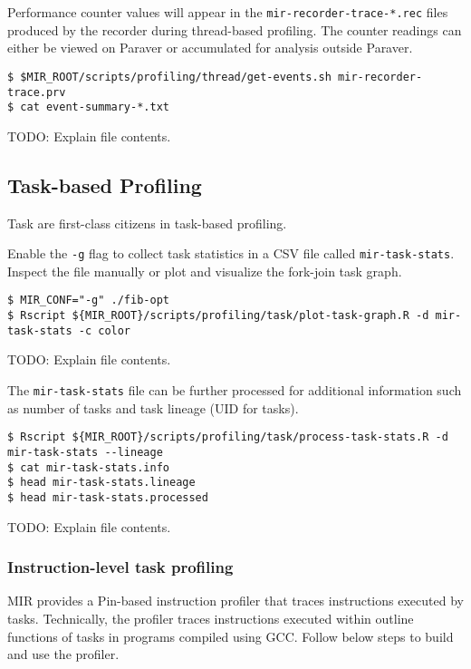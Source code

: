 \documentclass[11pt,a4paper]{article}
\begin{document}
Performance counter values will appear in the \texttt{mir-recorder-trace-*.rec} files produced by the recorder during thread-based profiling. The counter readings can either be viewed on Paraver or accumulated for analysis outside Paraver.

\begin{lstlisting}[style=MyInputStyle]
$ $MIR_ROOT/scripts/profiling/thread/get-events.sh mir-recorder-trace.prv
$ cat event-summary-*.txt
\end{lstlisting}

TODO: Explain file contents.

\subsection{Task-based Profiling}\label{task-based-profiling}

Task are first-class citizens in task-based profiling.

Enable the \texttt{-g} flag to collect task statistics in a CSV file called \texttt{mir-task-stats}. Inspect the file manually or plot and visualize the fork-join task graph.

\begin{lstlisting}[style=MyInputStyle]
$ MIR_CONF="-g" ./fib-opt
$ Rscript ${MIR_ROOT}/scripts/profiling/task/plot-task-graph.R -d mir-task-stats -c color
\end{lstlisting}

TODO: Explain file contents.

The \texttt{mir-task-stats} file can be further processed for additional information such as number of tasks and task lineage (UID for tasks).

\begin{lstlisting}[style=MyInputStyle]
$ Rscript ${MIR_ROOT}/scripts/profiling/task/process-task-stats.R -d mir-task-stats --lineage
$ cat mir-task-stats.info
$ head mir-task-stats.lineage
$ head mir-task-stats.processed
\end{lstlisting}

TODO: Explain file contents.

\subsubsection{Instruction-level task profiling}\label{instruction-level-task-profiling}

MIR provides a Pin-based instruction profiler that traces instructions executed by tasks. Technically, the profiler traces instructions executed within outline functions of tasks in programs compiled using GCC. Follow below steps to build and use the profiler.
\end{document}
